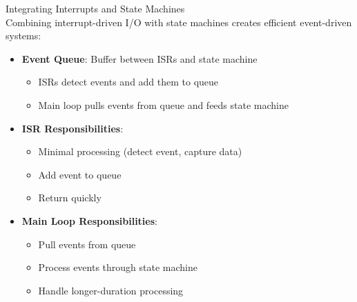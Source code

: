 \begin{concept}{Integrating Interrupts and State Machines}\\
Combining interrupt-driven I/O with state machines creates efficient event-driven systems:
\begin{itemize}
    \item \textbf{Event Queue}: Buffer between ISRs and state machine
    \begin{itemize}
        \item ISRs detect events and add them to queue
        \item Main loop pulls events from queue and feeds state machine
    \end{itemize}
    \item \textbf{ISR Responsibilities}:
    \begin{itemize}
        \item Minimal processing (detect event, capture data)
        \item Add event to queue
        \item Return quickly
    \end{itemize}
    \item \textbf{Main Loop Responsibilities}:
    \begin{itemize}
        \item Pull events from queue
        \item Process events through state machine
        \item Handle longer-duration processing
    \end{itemize}
\end{itemize}
\end{concept}

